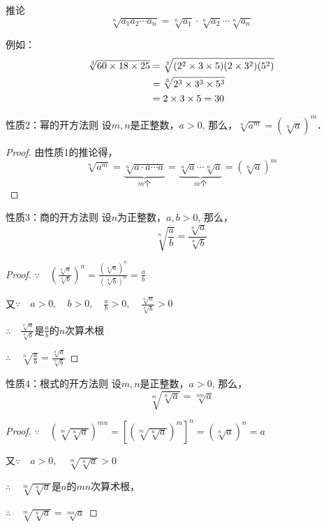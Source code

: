 \begin{blk}{推论}
\[\sqrt[n]{a_1a_2\cdots a_n}=\sqrt[n]{a_1}\cdot \sqrt[n]{a_2}\cdots \sqrt[n]{a_n}\]
\end{blk}

例如：\[\begin{split}
    \sqrt[3]{60\times 18\times 25}&=\sqrt[3]{(2^2\times 3\times 5)(2\times 3^2)(5^2)}\\
    &=\sqrt[3]{2^3\times 3^3\times 5^3}\\
    &=2\times 3\times 5=30
\end{split}\]

\begin{blk}{性质2：幂的开方法则}
设$m,n$是正整数，$a>0$, 那么，$\sqrt[n]{a^m}=\left(\sqrt[n]{a}\right)^m$．

\end{blk}

\begin{proof}
由性质1的推论得，
\[\sqrt[n]{a^m}=\underbrace{\sqrt[n]{a\cdot a\cdots a}}_{\text{$m$个}}=\underbrace{\sqrt[n]{a}\cdots \sqrt[n]{a}}_{\text{$m$个}}=\left(\sqrt[n]{a}\right)^m\]
\end{proof}

\begin{blk}{性质3：商的开方法则}
    设$n$为正整数，$a,b>0$, 那么，
\[\sqrt[n]{\frac{a}{b}}=\frac{\sqrt[n]{a}}{\sqrt[n]{b}}\] 
\end{blk}

\begin{proof}
$\because\quad \left(\frac{\sqrt[n]{a}}{\sqrt[n]{b}}\right)^n=\frac{\left(\sqrt[n]{a}\right)^n}{\left(\sqrt[n]{b}\right)^n}=\frac{a}{b}$

又$\because\quad a>0,\quad   b>0,\quad \frac{a}{b}>0,\quad \frac{\sqrt[n]{a}}{\sqrt[n]{b}}>0$

$\therefore\quad \frac{\sqrt[n]{a}}{\sqrt[n]{b}}$是$\frac{a}{b}$的$n$次算术根

$\therefore\quad \sqrt[n]{\frac{a}{b}}=\frac{\sqrt[n]{a}}{\sqrt[n]{b}}$

\end{proof}

\begin{blk}{性质4：根式的开方法则}
    设$m,n$是正整数，$a>0$, 那么，
\[\sqrt[m]{\sqrt[n]{a}}=\sqrt[mn]{a}\]
\end{blk}

\begin{proof}
    $\because\quad \left(\sqrt[m]{\sqrt[n]{a}}\right)^{mn}=\left[\left(\sqrt[m]{\sqrt[n]{a}}\right)^m\right]^n=\left(\sqrt[n]{a}\right)^n=a$

    又$\because\quad a>0,\quad \sqrt[m]{\sqrt[n]{a}}>0 $
    
    $\therefore\quad \sqrt[m]{\sqrt[n]{a}}$是$a$的$mn$次算术根，

    $\therefore\quad \sqrt[m]{\sqrt[n]{a}}=\sqrt[mn]{a}$
\end{proof}


